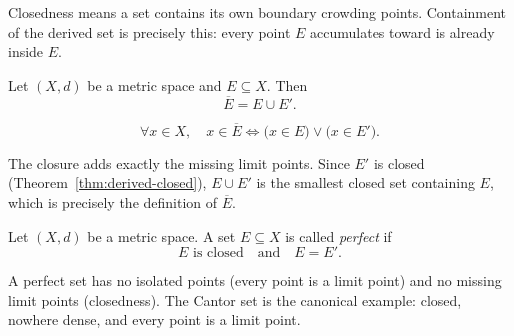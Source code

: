 \begin{remark*}[Intuition]
Closedness means a set contains its own boundary crowding points.
Containment of the derived set is precisely this: every point $E$ accumulates
toward is already inside $E$.
\end{remark*}

\begin{theorem}
\label{thm:closure-formula}
Let $(X,d)$ be a metric space and $E \subseteq X$.
Then
\[
\overline{E} = E \cup E'.
\]
\end{theorem}

\begin{remark*}
\[
\forall x \in X,\quad
x \in \overline{E}
\iff
\bigl(x \in E\bigr)
\lor
\bigl(x \in E'\bigr).
\]
\end{remark*}

\begin{remark*}[Consequence]
The closure adds exactly the missing limit points.
Since $E'$ is closed (Theorem~\ref{thm:derived-closed}),
$E \cup E'$ is the smallest closed set containing $E$,
which is precisely the definition of $\overline{E}$.
\end{remark*}

\begin{tcolorbox}[colback=propbox, colframe=propborder, arc=2pt,
  left=6pt, right=6pt, top=4pt, bottom=4pt,
  title={\small\textbf{Definition (Perfect Set)}},
  fonttitle=\small\bfseries]
\begin{definition}
\label{def:perfect-set}
Let $(X,d)$ be a metric space.
A set $E \subseteq X$ is called \emph{perfect} if
\[
E \text{ is closed}
\quad \text{and} \quad
E = E'.
\]
\end{definition}
\end{tcolorbox}

\begin{remark*}[Intuition]
A perfect set has no isolated points (every point is a limit point) and no
missing limit points (closedness).
The Cantor set is the canonical example:
closed, nowhere dense, and every point is a limit point.
\end{remark*}



